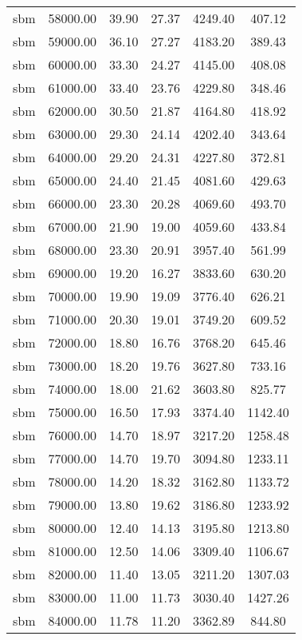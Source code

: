 \begin{table}[ht]
\begin{table}[ht]
\begin{tabular}{|cccccc}
  sbm & 58000.00 & 39.90 & 27.37 & 4249.40 & 407.12 \\ 
  sbm & 59000.00 & 36.10 & 27.27 & 4183.20 & 389.43 \\ 
  sbm & 60000.00 & 33.30 & 24.27 & 4145.00 & 408.08 \\ 
  sbm & 61000.00 & 33.40 & 23.76 & 4229.80 & 348.46 \\ 
  sbm & 62000.00 & 30.50 & 21.87 & 4164.80 & 418.92 \\ 
  sbm & 63000.00 & 29.30 & 24.14 & 4202.40 & 343.64 \\ 
  sbm & 64000.00 & 29.20 & 24.31 & 4227.80 & 372.81 \\ 
  sbm & 65000.00 & 24.40 & 21.45 & 4081.60 & 429.63 \\ 
  sbm & 66000.00 & 23.30 & 20.28 & 4069.60 & 493.70 \\ 
  sbm & 67000.00 & 21.90 & 19.00 & 4059.60 & 433.84 \\ 
  sbm & 68000.00 & 23.30 & 20.91 & 3957.40 & 561.99 \\ 
  sbm & 69000.00 & 19.20 & 16.27 & 3833.60 & 630.20 \\ 
  sbm & 70000.00 & 19.90 & 19.09 & 3776.40 & 626.21 \\ 
  sbm & 71000.00 & 20.30 & 19.01 & 3749.20 & 609.52 \\ 
  sbm & 72000.00 & 18.80 & 16.76 & 3768.20 & 645.46 \\ 
  sbm & 73000.00 & 18.20 & 19.76 & 3627.80 & 733.16 \\ 
  sbm & 74000.00 & 18.00 & 21.62 & 3603.80 & 825.77 \\ 
  sbm & 75000.00 & 16.50 & 17.93 & 3374.40 & 1142.40 \\ 
  sbm & 76000.00 & 14.70 & 18.97 & 3217.20 & 1258.48 \\ 
  sbm & 77000.00 & 14.70 & 19.70 & 3094.80 & 1233.11 \\ 
  sbm & 78000.00 & 14.20 & 18.32 & 3162.80 & 1133.72 \\ 
  sbm & 79000.00 & 13.80 & 19.62 & 3186.80 & 1233.92 \\ 
  sbm & 80000.00 & 12.40 & 14.13 & 3195.80 & 1213.80 \\ 
  sbm & 81000.00 & 12.50 & 14.06 & 3309.40 & 1106.67 \\ 
  sbm & 82000.00 & 11.40 & 13.05 & 3211.20 & 1307.03 \\ 
  sbm & 83000.00 & 11.00 & 11.73 & 3030.40 & 1427.26 \\ 
  sbm & 84000.00 & 11.78 & 11.20 & 3362.89 & 844.80 \\ 

\end{tabular}
\end{table}
\end{table}
